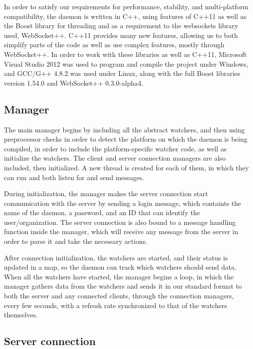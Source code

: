 \documentclass{l3proj}
\begin{document}
In order to satisfy our requirements for performance, stability, and multi-platform compatibility, the daemon is written in C++, using features of C++11 as well as the Boost library for threading and as a requirement to the websockets library used, WebSocket++.
C++11 provides many new features, allowing us to both simplify parts of the code as well as use complex features, mostly through WebSocket++. In order to work with these libraries as well as C++11, Microsoft Visual Studio 2012 was used to program and compile the project under Windows, and GCC/G++ 4.8.2 was used under Linux, along with the full Boost libraries version 1.54.0 and WebSocket++ 0.3.0-alpha4.

\subsection{Manager}

The main manager begins by including all the abstract watchers, and then using preprocessor checks in order to detect the platform on which the daemon is being compiled, in order to include the platform-specific watcher code, as well as initialize the watchers. The client and server connection managers are also included, then initialized. A new thread is created for each of them, in which they can run and both listen for and send messages. 

During initialization, the manager makes the server connection start communication with the server by sending a login message, which containts the name of the daemon, a password, and an ID that can identify the user/organization. The server connection is also bound to a message handling function inside the manager, which will receive any message from the server in order to parse it and take the necessary actions.

After connection initialization, the watchers are started, and their status is updated in a map, so the daemon can track which watchers should send data. When all the watchers have started, the manager begins a loop, in which the manager gathers data from the watchers and sends it in our standard format to both the server and any connected clients, through the connection managers, every few seconds, with a refresh rate synchronized to that of the watchers themselves.

\subsection{Server connection}
\end{document}
